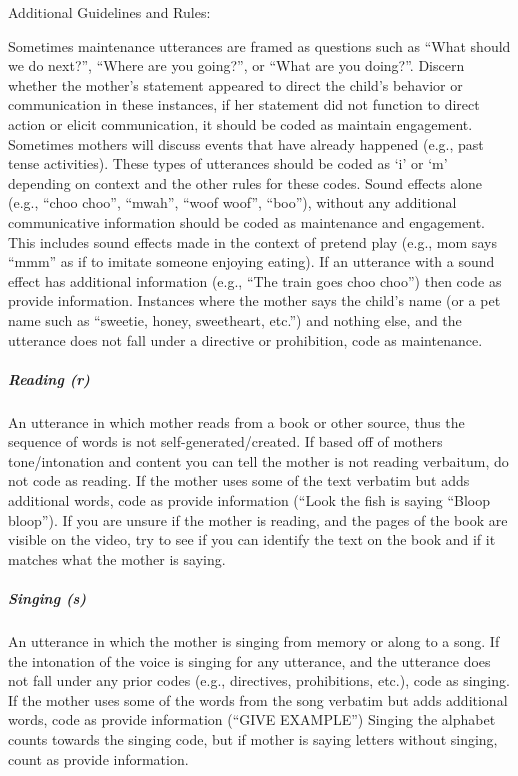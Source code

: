 \documentclass[
  12pt,
]{book}
\begin{document}
Additional Guidelines and Rules:

Sometimes maintenance utterances are framed as questions such as ``What should we do next?'', ``Where are you going?'', or ``What are you doing?''. Discern whether the mother's statement appeared to direct the child's behavior or communication in these instances, if her statement did not function to direct action or elicit communication, it should be coded as maintain engagement.
Sometimes mothers will discuss events that have already happened (e.g., past tense activities). These types of utterances should be coded as `i' or `m' depending on context and the other rules for these codes.
Sound effects alone (e.g., ``choo choo'', ``mwah'', ``woof woof'', ``boo''), without any additional communicative information should be coded as maintenance and engagement. This includes sound effects made in the context of pretend play (e.g., mom says ``mmm'' as if to imitate someone enjoying eating). If an utterance with a sound effect has additional information (e.g., ``The train goes choo choo'') then code as provide information.
Instances where the mother says the child's name (or a pet name such as ``sweetie, honey, sweetheart, etc.'') and nothing else, and the utterance does not fall under a directive or prohibition, code as maintenance.

\hypertarget{reading}{%
\subparagraph*{Reading (r)}\label{reading}}

An utterance in which mother reads from a book or other source, thus the sequence of words is not self-generated/created. If based off of mothers tone/intonation and content you can tell the mother is not reading verbaitum, do not code as reading. If the mother uses some of the text verbatim but adds additional words, code as provide information (``Look the fish is saying ``Bloop bloop'').
If you are unsure if the mother is reading, and the pages of the book are visible on the video, try to see if you can identify the text on the book and if it matches what the mother is saying.

\hypertarget{singing}{%
\subparagraph*{Singing (s)}\label{singing}}

An utterance in which the mother is singing from memory or along to a song. If the intonation of the voice is singing for any utterance, and the utterance does not fall under any prior codes (e.g., directives, prohibitions, etc.), code as singing. If the mother uses some of the words from the song verbatim but adds additional words, code as provide information (``GIVE EXAMPLE'')
Singing the alphabet counts towards the singing code, but if mother is saying letters without singing, count as provide information.
\end{document}

